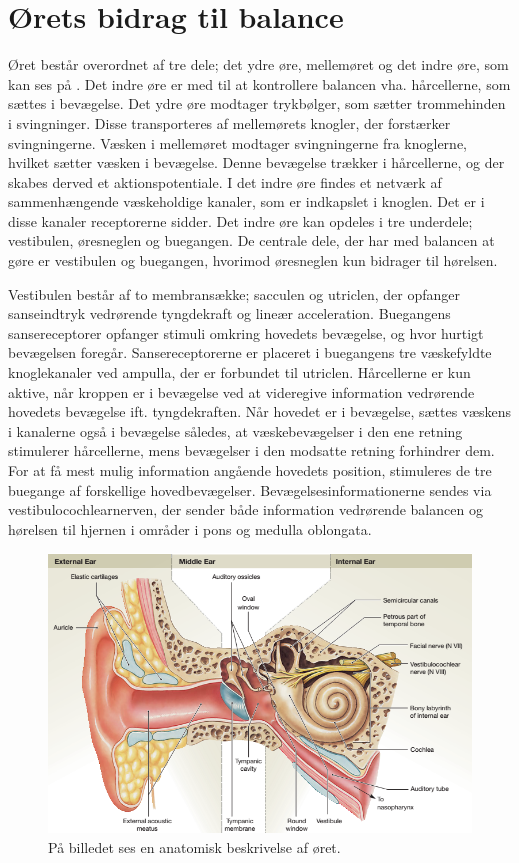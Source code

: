 \section{Ørets bidrag til balance}
Øret består overordnet af tre dele; det ydre øre, mellemøret og det indre øre, som kan ses på . Det indre øre er med til at kontrollere balancen vha. hårcellerne, som sættes i bevægelse. Det ydre øre modtager trykbølger, som sætter trommehinden i svingninger. Disse transporteres af mellemørets knogler, der forstærker svingningerne. Væsken i mellemøret modtager svingningerne fra knoglerne, hvilket sætter væsken i bevægelse. Denne bevægelse trækker i hårcellerne, og der skabes derved et aktionspotentiale. I det indre øre findes et netværk af sammenhængende væskeholdige kanaler, som er indkapslet i knoglen. Det er i disse kanaler receptorerne sidder. Det indre øre kan opdeles i tre underdele; vestibulen, øresneglen og buegangen. De centrale dele, der har med balancen at gøre er vestibulen og buegangen, hvorimod øresneglen kun bidrager til hørelsen.\cite{Martini2012}

Vestibulen består af to membransække; sacculen og utriclen, der opfanger sanseindtryk vedrørende tyngdekraft og lineær acceleration. Buegangens sansereceptorer opfanger stimuli omkring hovedets bevægelse, og hvor hurtigt bevægelsen foregår. Sansereceptorerne er placeret i buegangens tre væskefyldte knoglekanaler ved ampulla, der er forbundet til utriclen. Hårcellerne er kun aktive, når kroppen er i bevægelse ved at videregive information vedrørende hovedets bevægelse ift. tyngdekraften. Når hovedet er i bevægelse, sættes væskens i kanalerne også i bevægelse således, at væskebevægelser i den ene retning stimulerer hårcellerne, mens bevægelser i den modsatte retning forhindrer dem. For at få mest mulig information angående hovedets position, stimuleres de tre buegange af forskellige hovedbevægelser. Bevægelsesinformationerne sendes via vestibulocochlearnerven, der sender både information vedrørende balancen og hørelsen til hjernen i områder i pons og medulla oblongata. \cite{Martini2012}    

\begin{figure}[H]
	\centering
	\includegraphics[scale=0.75]{figures/bProblemanalyse/Oerets-anatomi.jpg}
	\caption{På billedet ses en anatomisk beskrivelse af øret. \cite{Martini2012}}
	\label{Oeret}
\end{figure}

